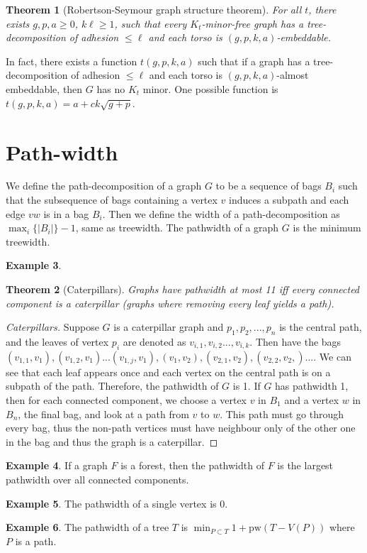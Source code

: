 \documentclass[]{article}
\newcommand{\pw}{\text{pw}}
\newtheorem{theorem}{Theorem}
\theoremstyle{definition}
\newtheorem{example}[theorem]{Example}
\numberwithin{theorem}{section}
\numberwithin{equation}{section}
\begin{document}
\begin{theorem}[Robertson-Seymour graph structure theorem]
	For all $t$, there exists $g, p, a \geq 0$, $k \ell \geq 1$, such that every $K_t$-minor-free graph has a tree-decomposition of adhesion $\leq \ell$ and each torso is $(g, p, k, a)$-embeddable. 
\end{theorem}
In fact, there exists a function $t(g, p, k, a)$ such that if a graph has a tree-decomposition of adhesion $\leq \ell$ and each torso is $(g, p, k, a)$-almost embeddable, then $G$ has no $K_t$ minor. One possible function is $t(g, p, k, a) = a + ck \sqrt{g + p}$. 

\section{Path-width}
We define the path-decomposition of a graph $G$ to be a sequence of bags $B_i$ such that the subsequence of bags containing a vertex $v$ induces a subpath and each edge $vw$ is in a bag $B_i$. Then we define the width of a path-decomposition as $\max_i \lbrace |B_i| \rbrace -1$, same as treewidth. The pathwidth of a graph $G$ is the minimum treewidth.
\begin{example}
	\begin{theorem}[Caterpillars]
		Graphs have pathwidth at most 11 iff every connected component is a caterpillar (graphs where removing every leaf yields a path).
	\end{theorem}
	\begin{proof}[Caterpillars]
		Suppose $G$ is a caterpillar graph and $p_1, p_2, ..., p_n$ is the central path, and the leaves of vertex $p_i$ are denoted as $v_{i, 1}, v_{i, 2} ..., v_{i, k}$. Then have the bags $(v_{1, 1}, v_1), (v_{1, 2}, v_1)... (v_{1, j}, v_1), (v_1, v_2), (v_{2, 1}, v_2), (v_{2,2}, v_2,)... $. We can see that each leaf appears once and each vertex on the central path is on a subpath of the path. Therefore, the pathwidth of $G$ is 1. If $G$ has pathwidth 1, then for each connected component, we choose a vertex $v$ in $B_1$ and a vertex $w$ in $B_n$, the final bag, and look at a path from $v$ to $w$. This path must go through every bag, thus the non-path vertices must have neighbour only of the other one in the bag and thus the graph is a caterpillar. 
	\end{proof}
	
\end{example}
\begin{example}
	If a graph $F$ is a forest, then the pathwidth of $F$ is the largest pathwidth over all connected components.
\end{example}
\begin{example}
	The pathwidth of a single vertex is 0.
\end{example}
\begin{example}
	The pathwidth of a tree $T$ is $\min_{P \subset T} 1 + \pw(T - V(P))$ where $P$ is a path. 
\end{example}
\end{document}
